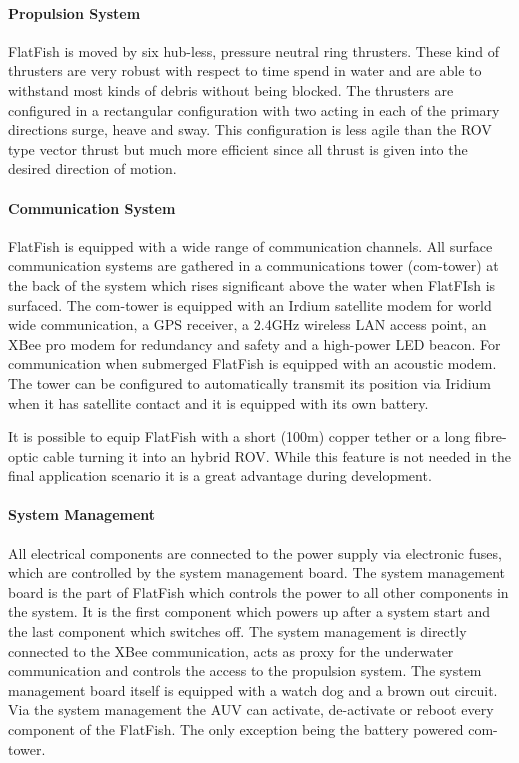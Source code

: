 \documentclass[conference]{IEEEtran}
\begin{document}
\paragraph{\textbf{Propulsion System}} FlatFish is moved by six hub-less, pressure neutral 
ring thrusters. These kind of thrusters are very robust with respect to time spend in water 
and are able to withstand most kinds of debris without being blocked. The thrusters are 
configured in a rectangular configuration with two acting in each of the primary directions 
surge, heave and sway. This configuration is less agile than the ROV type vector thrust but 
much more efficient since all thrust is given into the desired direction of motion.

\paragraph{\textbf{Communication System}} FlatFish is equipped with a wide range of 
communication channels. All surface communication systems are gathered in a 
communications tower (com-tower) at the back of the system which rises significant above 
the water when FlatFIsh is surfaced. The com-tower is equipped with an Irdium satellite 
modem for world wide communication, a GPS receiver, a 2.4GHz wireless LAN access point, 
an XBee pro modem for redundancy and safety and a high-power LED beacon. For 
communication when submerged  FlatFish is equipped with an acoustic modem. The tower 
can be configured to automatically transmit its position via Iridium when it has satellite 
contact and it is equipped with its own battery.

It is possible to equip FlatFish with a short (100m) copper tether or a long fibre-optic cable 
turning it into an hybrid ROV. While this feature is not needed in the final application 
scenario it is a great advantage during development.

\paragraph{\textbf{System Management}} All electrical components are connected to the 
power supply via electronic fuses, which are controlled by the system management board. 
The system management board is the part of FlatFish which controls the power to all other 
components in the system. It is the first component which powers up after a system start 
and the last component which switches off. The system management is directly connected 
to the XBee communication, acts as proxy for the underwater communication and controls 
the access to the propulsion system. The system management board itself is equipped with 
a watch dog and a brown out circuit. Via the system management the AUV can activate, 
de-activate or reboot every component of the FlatFish. The only exception being the battery 
powered com-tower. 
\end{document}
